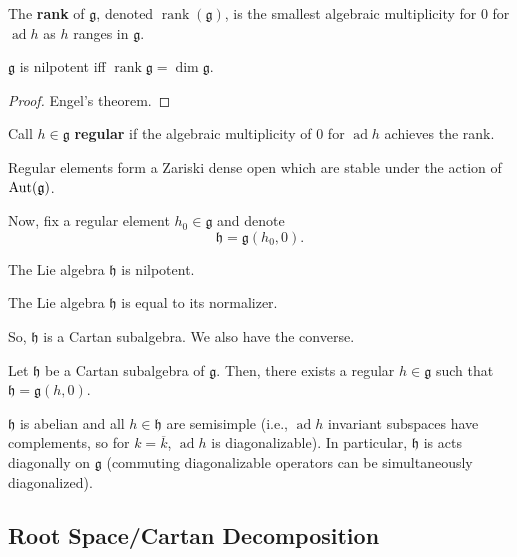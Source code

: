 \documentclass[12pt]{article}
\newcommand{\fg}{\mathfrak{g}}
\newcommand{\fh}{\mathfrak{h}}
\DeclareMathOperator{\ad}{ad}
\DeclareMathOperator{\rank}{rank}
\begin{document}
\begin{defn}
    The \textbf{rank} of $\fg$, denoted $\rank(\fg)$, is the smallest algebraic multiplicity for $0$ for $\ad h$ as $h$ ranges in $\fg$.
\end{defn}

\begin{prop}
    $\fg$ is nilpotent iff $\rank \fg = \dim \fg$.
\end{prop}
\begin{proof}
    Engel's theorem.
\end{proof}

\begin{defn}
    Call $h\in \fg$ \textbf{regular} if the algebraic multiplicity of $0$ for $\ad h$ achieves the rank.
\end{defn}

\begin{rmk}
    Regular elements form a Zariski dense open which are stable under the action of $\Aut(\fg)$.
\end{rmk}

Now, fix a regular element $h_0\in \fg$ and denote
\[\fh = \fg(h_0,0).\]

\begin{lem}
    The Lie algebra $\fh$ is nilpotent.
\end{lem}

\begin{lem}
    The Lie algebra $\fh$ is equal to its normalizer.
\end{lem}

So, $\fh$ is a Cartan subalgebra. We also have the converse.
\begin{lem}
    Let $\fh$ be a Cartan subalgebra of $\fg$. Then, there exists a regular $h\in \fg$ such that $\fh = \fg(h,0)$.
\end{lem}

\begin{lem}
    $\fh$ is abelian and all $h\in \fh$ are semisimple (i.e., $\ad h$ invariant subspaces have complements, so for $k=\overline{k}$, $\ad h$ is diagonalizable). In particular, $\fh$ is acts diagonally on $\fg$ (commuting diagonalizable operators can be simultaneously diagonalized). 
\end{lem}

\subsection{Root Space/Cartan Decomposition}
\end{document}
